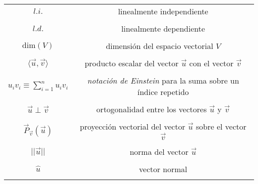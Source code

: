 \documentclass[notasLineal]{subfiles}
\begin{document}
\begin{tcolorbox}
\begin{tabular}{cc}
    $l.i.$ & linealmente independiente \\ \\
    $l.d.$ & linealmente dependiente \\ \\
    $\text{dim}(V)$ & dimensión del espacio vectorial $V$ \\ \\
    $\langle\vec{u},\vec{v}\rangle$ & producto escalar del vector $\vec{u}$ con el vector $\vec{v}$ \\ \\
    $u_i v_i \equiv \sum_{i=1}^n u_i v_i$ & \textit{notación de Einstein} para la suma sobre un índice repetido \\ \\
    $\vec{u}\perp\vec{v}$ & ortogonalidad entre los vectores $\vec{u}$ y $\vec{v}$ \\ \\
    $\vec{P}_{\vec{v}}(\vec{u})$ & proyección vectorial del vector $\vec{u}$ sobre el vector $\vec{v}$ \\ \\
    $||\vec{u}||$ & norma del vector $\vec{u}$ \\ \\
    $\hat{u}$ & vector normal \\ \\
    \end{tabular}
\end{tcolorbox}
\end{document}
